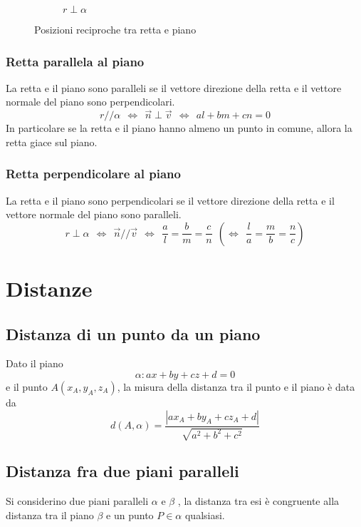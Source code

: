 \documentclass{article}     %
\newcommand\parallelo{/\!/} %
\begin{document}
\begin{figure}[h]
\begin{subfigure}{0.49\textwidth}
\begin{center}
                    \end{center}
                    \caption{$r\perp \alpha$}
                \end{subfigure}
                \caption{Posizioni reciproche tra retta e piano}
            \end{figure}
            \subsubsection{Retta parallela al piano}
                La retta e il piano sono paralleli se il vettore direzione della retta e il vettore normale del piano sono perpendicolari.
                \[r\parallelo\alpha ~~\Leftrightarrow~~\overrightarrow{n}\perp\overrightarrow{v}~~\Leftrightarrow~~ al+bm+cn=0\]
                In particolare se la retta e il piano hanno almeno un punto in comune, allora la retta giace sul piano. 
                \subsubsection{Retta perpendicolare al piano}
                La retta e il piano sono perpendicolari se il vettore direzione della retta e il vettore normale del piano sono paralleli.
                \[r\perp\alpha ~~\Leftrightarrow~~\overrightarrow{n}\parallelo\overrightarrow{v}~~\Leftrightarrow~~ \frac{a}{l}=\frac{b}{m}=\frac{c}{n}~~\left(\Leftrightarrow~~ \frac{l}{a}=\frac{m}{b}=\frac{n}{c}\right)\]
    \section{Distanze}
        \subsection{Distanza di un punto da un piano}
            Dato il piano \[\alpha:ax+by+cz+d=0\] e il punto $A(x_A,y_A,z_A)$, la misura della distanza tra il punto e il piano è data da
            \[d(A,\alpha)=\frac{|ax_A+by_A+cz_A+d|}{\sqrt{a^2+b^2+c^2}}\]
        \subsection{Distanza fra due piani paralleli}
            Si considerino due piani paralleli $\alpha$ e $\beta$ , la distanza tra esi è congruente alla distanza tra il piano $\beta$     e un punto $P\in\alpha$ qualsiasi. 
\end{document}
